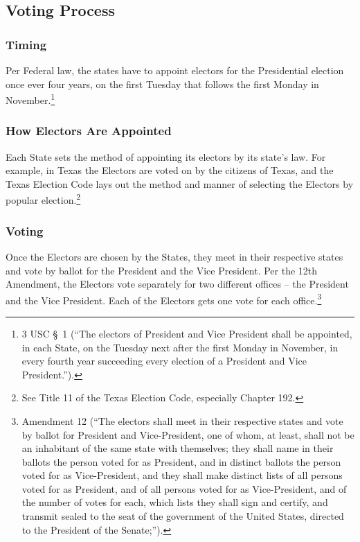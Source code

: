 \subsection{Voting Process}

\subsubsection{Timing}

Per Federal law, the states have to appoint electors for the Presidential election once ever four years, on the first Tuesday that follows the first Monday in November.\footnote{3 USC \S\ 1 (``The electors of President and Vice President shall be appointed, in each State, on the Tuesday next after the first Monday in November, in every fourth year succeeding every election of a President and Vice President.'').}

\subsubsection{How Electors Are Appointed}
Each State sets the method of appointing its electors by its state's law.  For example, in Texas the Electors are voted on by the citizens of Texas, and the Texas Election Code lays out the method and manner of selecting the Electors by popular election.\footnote{See Title 11 of the Texas Election Code, especially Chapter 192.}

\subsubsection{Voting}
Once the Electors are chosen by the States, they meet in their respective states and vote by ballot for the President and the Vice President.
Per the 12th Amendment, the Electors vote separately for two different offices -- the President and the Vice President.  Each of the Electors gets one vote for each office.\footnote{Amendment 12 (``The electors shall meet in their respective states and vote by ballot for President and Vice-President, one of whom, at least, shall not be an inhabitant of the same state with themselves; they shall name in their ballots the person voted for as President, and in distinct ballots the person voted for as Vice-President, and they shall make distinct lists of all persons voted for as President, and of all persons voted for as Vice-President, and of the number of votes for each, which lists they shall sign and certify, and transmit sealed to the seat of the government of the United States, directed to the President of the Senate;'').}


